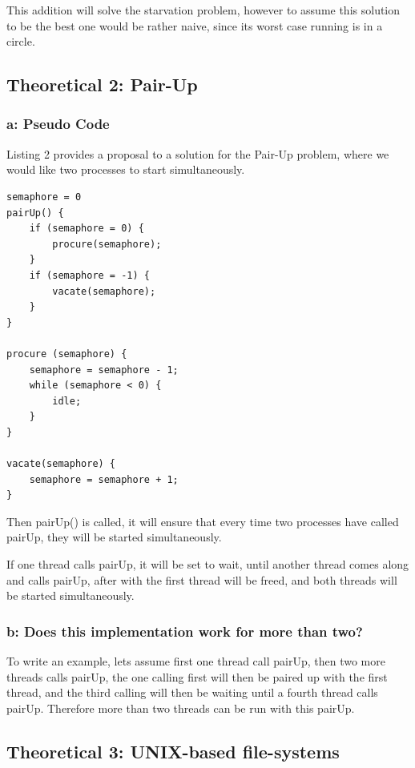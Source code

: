 \documentclass[11pt,a4paper]{article}
\theoremstyle{plain}
\theoremstyle{definition}
\theoremstyle{remark}
\numberwithin{equation}{section}
\begin{document}
This addition will solve the starvation problem, however to assume this solution to be the best one would be rather naive, since its worst case running is in a circle.


\subsection*{Theoretical 2: Pair-Up}

\subsubsection*{a: Pseudo Code}

Listing 2 provides a proposal to a solution for the Pair-Up problem, where we would like two processes to start simultaneously.

\begin{lstlisting}[caption={Pair-Up Pseudo Code},label={lst:pu_pseudo}]
semaphore = 0
pairUp() {
    if (semaphore = 0) {
        procure(semaphore);
    }
    if (semaphore = -1) {
        vacate(semaphore);
    }
}

procure (semaphore) {
    semaphore = semaphore - 1;
    while (semaphore < 0) {
        idle;
    }
}

vacate(semaphore) {
    semaphore = semaphore + 1;
}
\end{lstlisting}

Then pairUp() is called, it will ensure that every time two processes have called pairUp, they will be started simultaneously.

If one thread calls pairUp, it will be set to wait, until another thread comes along and calls pairUp, after with the first thread will be freed, and both threads will be started simultaneously.

\subsubsection*{b: Does this implementation work for more than two?}

To write an example, lets assume first one thread call pairUp, then two more threads calls pairUp, the one calling first will then be paired up with the first thread, and the third calling will then be waiting until a fourth thread calls pairUp. Therefore more than two threads can be run with this pairUp.


\subsection*{Theoretical 3: UNIX-based file-systems}
\end{document}
